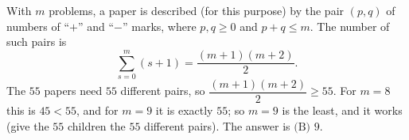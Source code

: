 With $m$ problems, a paper is described (for this purpose) by the pair $(p,q)$ of numbers of ``$+$'' and ``$-$'' marks, where $p,q\ge0$ and $p+q\le m$. The number of such pairs is
\[
\sum_{s=0}^{m}(s+1)=\dfrac{(m+1)(m+2)}{2}.
\]
The $55$ papers need $55$ different pairs, so $\dfrac{(m+1)(m+2)}{2}\ge55$. For $m=8$ this is $45<55$, and for $m=9$ it is exactly $55$; so $m=9$ is the least, and it works (give the $55$ children the $55$ different pairs). The answer is $\boxed{\text{(B) } 9}$.
